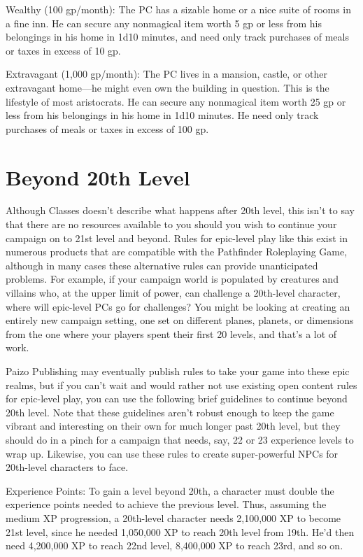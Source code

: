 Wealthy (100 gp/month): The PC has a sizable home or a nice suite of rooms in a fine inn. He can secure any nonmagical item worth 5 gp or less from his belongings in his home in 1d10 minutes, and need only track purchases of meals or taxes in excess of 10 gp.
				
Extravagant (1,000 gp/month): The PC lives in a mansion, castle, or other extravagant home---he might even own the building in question. This is the lifestyle of most aristocrats. He can secure any nonmagical item worth 25 gp or less from his belongings in his home in 1d10 minutes. He need only track purchases of meals or taxes in excess of 100 gp.
				
\section{Beyond 20th Level}

				
Although Classes doesn't describe what happens after 20th level, this isn't to say that there are no resources available to you should you wish to continue your campaign on to 21st level and beyond. Rules for epic-level play like this exist in numerous products that are compatible with the Pathfinder Roleplaying Game, although in many cases these alternative rules can provide unanticipated problems. For example, if your campaign world is populated by creatures and villains who, at the upper limit of power, can challenge a 20th-level character, where will epic-level PCs go for challenges? You might be looking at creating an entirely new campaign setting, one set on different planes, planets, or dimensions from the one where your players spent their first 20 levels, and that's a lot of work.
				
Paizo Publishing may eventually publish rules to take your game into these epic realms, but if you can't wait and would rather not use existing open content rules for epic-level play, you can use the following brief guidelines to continue beyond 20th level. Note that these guidelines aren't robust enough to keep the game vibrant and interesting on their own for much longer past 20th level, but they should do in a pinch for a campaign that needs, say, 22 or 23 experience levels to wrap up. Likewise, you can use these rules to create super-powerful NPCs for 20th-level characters to face.
				
Experience Points: To gain a level beyond 20th, a character must double the experience points needed to achieve the previous level. Thus, assuming the medium XP progression, a 20th-level character needs 2,100,000 XP to become 21st level, since he needed 1,050,000 XP to reach 20th level from 19th. He'd then need 4,200,000 XP to reach 22nd level, 8,400,000 XP to reach 23rd, and so on.
				
